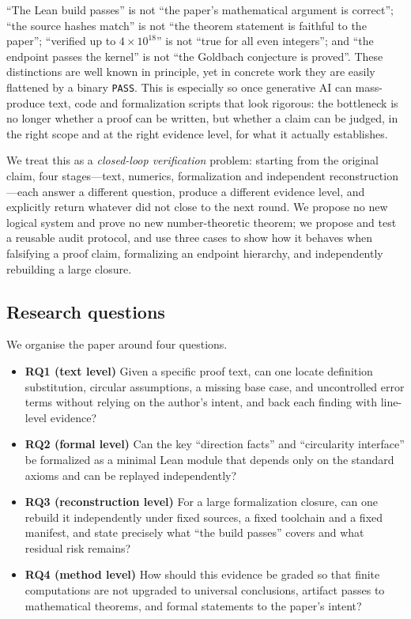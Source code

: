 \documentclass[11pt,a4paper]{article}
\theoremstyle{plain}
\theoremstyle{definition}
\begin{document}
``The Lean build passes'' is not ``the paper's mathematical argument is correct''; ``the source hashes match'' is not ``the theorem statement is faithful to the paper''; ``verified up to $4\times 10^{18}$'' is not ``true for all even integers''; and ``the endpoint passes the kernel'' is not ``the Goldbach conjecture is proved''. These distinctions are well known in principle, yet in concrete work they are easily flattened by a binary \texttt{PASS}. This is especially so once generative AI can mass-produce text, code and formalization scripts that look rigorous: the bottleneck is no longer whether a proof can be written, but whether a claim can be judged, in the right scope and at the right evidence level, for what it actually establishes.

We treat this as a \emph{closed-loop verification} problem: starting from the original claim, four stages---text, numerics, formalization and independent reconstruction---each answer a different question, produce a different evidence level, and explicitly return whatever did not close to the next round. We propose no new logical system and prove no new number-theoretic theorem; we propose and test a reusable audit protocol, and use three cases to show how it behaves when falsifying a proof claim, formalizing an endpoint hierarchy, and independently rebuilding a large closure.

\subsection{Research questions}
\label{sec:rq}

We organise the paper around four questions.

\begin{itemize}
\item \textbf{RQ1 (text level)} Given a specific proof text, can one locate definition substitution, circular assumptions, a missing base case, and uncontrolled error terms without relying on the author's intent, and back each finding with line-level evidence?
\item \textbf{RQ2 (formal level)} Can the key ``direction facts'' and ``circularity interface'' be formalized as a minimal Lean module that depends only on the standard axioms and can be replayed independently?
\item \textbf{RQ3 (reconstruction level)} For a large formalization closure, can one rebuild it independently under fixed sources, a fixed toolchain and a fixed manifest, and state precisely what ``the build passes'' covers and what residual risk remains?
\item \textbf{RQ4 (method level)} How should this evidence be graded so that finite computations are not upgraded to universal conclusions, artifact passes to mathematical theorems, and formal statements to the paper's intent?
\end{itemize}
\end{document}
